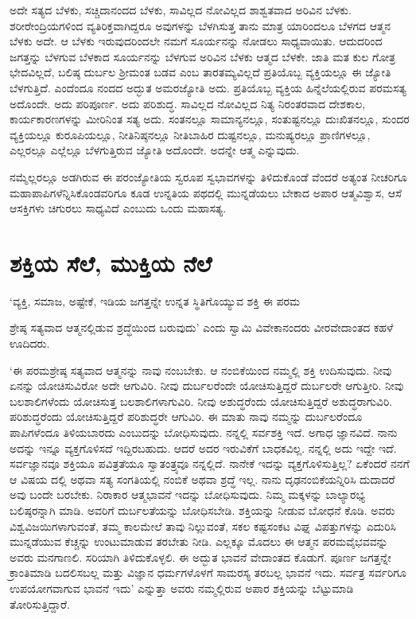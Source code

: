 ಅದೇ ಸತ್ಯದ ಬೆಳಕು, ಸಚ್ಚಿದಾನಂದದ ಬೆಳಕು, ಸಾವಿಲ್ಲದ ನೋವಿಲ್ಲದ ಶಾಶ್ವತವಾದ ಅರಿವಿನ ಬೆಳಕು. ಶರೀರೇಂದ್ರಿಯಗಳಿಂದ ವ್ಯತಿರಿಕ್ತವಾಗಿದ್ದರೂ ಅವುಗಳನ್ನು ಬೆಳಗಿಸುತ್ತ ತಾನು ಮಾತ್ರ ಯಾರಿಂದಲೂ ಬೆಳಗದ ಆತ್ಮನ ಬೆಳಕು ಅದೇ. ಆ ಬೆಳಕು ಇರುವುದರಿಂದಲೇ ನಮಗೆ ಸೂರ್ಯನನ್ನು ನೋಡಲು ಸಾಧ್ಯವಾಯಿತು. ಆದುದರಿಂದ ಜಗತ್ತನ್ನು ಬೆಳಗುವ ಬೆಳಕಾದ ಸೂರ್ಯನನ್ನು ಬೆಳಗುವ ಅರಿವಿನ ಬೆಳಕು ಆತ್ಮದ ಬೆಳಕೇ. ಜಾತಿ ಮತ ಕುಲ ಗೋತ್ರ ಭೇದವಿಲ್ಲದೆ, ಬಲಿಷ್ಠ ದುರ್ಬಲ ಶ‍್ರೀಮಂತ ಬಡವ ಎಂಬ ತಾರತಮ್ಯವಿಲ್ಲದೆ ಪ್ರತಿಯೊಬ್ಬ ವ್ಯಕ್ತಿಯಲ್ಲೂ ಈ ಜ್ಯೋತಿ ಬೆಳಗುತ್ತಿದೆ. ಎಂದೆಂದೂ ನಂದದ ಅದ್ಭುತ ಅಮರಜ್ಯೋತಿ ಅದು. ಪ್ರತಿಯೊಬ್ಬ ವ್ಯಕ್ತಿಯ ಹಿನ್ನೆಲೆಯಲ್ಲಿರುವ ಪರಮಸತ್ಯ ಅದೊಂದೇ. ಅದು ಪರಿಪೂರ್ಣ. ಅದು ಪರಿಶುದ್ಧ. ಸಾವಿಲ್ಲದ ನೋವಿಲ್ಲದ ನಿತ್ಯ ನಿರಂತರವಾದ ದೇಶಕಾಲ, ಕಾರ್ಯಕಾರಣಗಳನ್ನು ಮೀರಿನಿಂತ ಸತ್ಯ ಅದು. ಸಂತನಲ್ಲೂ ಸಾಮಾನ್ಯನಲ್ಲೂ, ಸಂತುಷ್ಟನಲ್ಲೂ ದುಃಖಿತನಲ್ಲೂ, ಸುಂದರ ವ್ಯಕ್ತಿ\-ಯಲ್ಲೂ ಕುರೂಪಿಯಲ್ಲೂ, ನೀತಿನಿಷ್ಠನಲ್ಲೂ ನೀತಿಬಾಹಿರ ದುಷ್ಟನಲ್ಲೂ, ಮನುಷ್ಯರಲ್ಲೂ ಪ್ರಾಣಿಗಳಲ್ಲೂ, ಎಲ್ಲರಲ್ಲೂ ಎಲ್ಲೆಲ್ಲೂ ಬೆಳಗುತ್ತಿರುವ ಜ್ಯೋತಿ ಅದೊಂದೇ. ಅದನ್ನೇ ಆತ್ಮ ಎನ್ನುವುದು.

ನಮ್ಮೆಲ್ಲರಲ್ಲೂ ಅಡಗಿರುವ ಈ ಪರಂಜ್ಯೋತಿಯ ಸ್ವರೂಪ ಸ್ವಭಾವಗಳನ್ನು ತಿಳಿದುಕೊಂಡೆ ವೆಂದರೆ ಅತ್ಯಂತ ನೀಚರಿಗೂ ಮಹಾಪಾಪಿಗಳೆನ್ನಿಸಿಕೊಂಡವರಿಗೂ ಕೂಡ ಉನ್ನತಿಯ ಪಥದಲ್ಲಿ ಮುನ್ನಡೆಯಲು ಬೇಕಾದ ಅಪಾರ ಆತ್ಮವಿಶ್ವಾಸ, ಆಸೆ ಆಸಕ್ತಿಗಳು ಚಿಗುರಲು ಸಾಧ್ಯವಿದೆ ಎಂಬುದು ಒಂದು ಮಹಾಸತ್ಯ.


\section*{ಶಕ್ತಿಯ ಸೆಲೆ, ಮುಕ್ತಿಯ ನೆಲೆ}


{\parfillskip=0pt ‘ವ್ಯಕ್ತಿ, ಸಮಾಜ, ಅಷ್ಟೇಕೆ, ಇಡಿಯ ಜಗತ್ತನ್ನೇ ಉನ್ನತ ಸ್ಥಿತಿಗೊಯ್ಯುವ ಶಕ್ತಿ ಈ ಪರಮ\par}\newpage\noindent ಶ್ರೇಷ್ಠ ಸತ್ಯವಾದ ಆತ್ಮನಲ್ಲಿಡುವ ಶ್ರದ್ಧೆಯಿಂದ ಬರುವುದು’ ಎಂದು ಸ್ವಾಮಿ ವಿವೇಕಾನಂದರು ವೀರವೇದಾಂತದ ಕಹಳೆ ಊದಿದರು.

‘ಈ ಪರಮಶ್ರೇಷ್ಠ ಸತ್ಯವಾದ ಆತ್ಮನನ್ನು ನಾವು ನಂಬಬೇಕು. ಆ ನಂಬಿಕೆಯಿಂದ ನಮ್ಮಲ್ಲಿ ಶಕ್ತಿ ಉದಿಸುವುದು. ನೀವು ಏನನ್ನು ಯೋಚಿಸುವಿರೋ ಅದೇ ಆಗುವಿರಿ. ನೀವು ದುರ್ಬಲರೆಂದೇ ಯೋಚಿಸುತ್ತಿದ್ದರೆ ದುರ್ಬಲರೇ ಆಗುತ್ತೀರಿ. ನೀವು ಬಲಶಾಲಿಗಳೆಂದು ಯೋಚಿಸುತ್ತ ಬಲಶಾಲಿ\-ಗಳಾ\-ಗುವಿರಿ. ನೀವು ಅಶುದ್ಧರೆಂದು ಯೋಚಿಸುತ್ತಿದ್ದರೆ ಅಶುದ್ಧರಾಗುವಿರಿ. ಪರಿಶುದ್ಧರೆಂದು ಯೋಚಿಸುತ್ತಿದ್ದರೆ ಪರಿಶುದ್ಧರೇ ಆಗುವಿರಿ. ಈ ಮಾತು ನಾವು ನಮ್ಮನ್ನು ದುರ್ಬಲರೆಂದೂ ಪಾಪಿಗಳೆಂದೂ ತಿಳಿಯಬಾರದು ಎಂಬುದನ್ನು ಬೋಧಿಸುವುದು. ನನ್ನಲ್ಲಿ ಸರ್ವಶಕ್ತಿ ಇದೆ. ಅಗಾಧ ಜ್ಞಾನವಿದೆ. ನಾನು ಅದನ್ನು ಇನ್ನೂ ವ್ಯಕ್ತಗೊಳಿಸದೆ ಇದ್ದಿರಬಹುದು. ಆದರೆ ಅದರ ಇರುವಿಕೆಗೆ ಬಾಧಕವಿಲ್ಲ. ನನ್ನಲ್ಲಿ ಅದು ಇದ್ದೇ ಇದೆ. ಸರ್ವಜ್ಞಾನವೂ ಶಕ್ತಿಯೂ ಪವಿತ್ರತೆಯೂ ಸ್ವಾತಂತ್ರ್ಯವೂ ನನ್ನಲ್ಲಿದೆ. ನಾನೇಕೆ ಇದನ್ನು ವ್ಯಕ್ತಗೊಳಿಸುತ್ತಿಲ್ಲ? ಏಕೆಂದರೆ ನನಗೆ ಆ ವಿಷಯ ದಲ್ಲಿ ಅಥವಾ ಸತ್ಯ ಸಂಗತಿಯಲ್ಲಿ ನಂಬಿಕೆ ಅಥವಾ ಶ್ರದ್ಧೆ ಇಲ್ಲ. ನಾನು ದೃಢನಂಬಿಕೆಯನ್ನಿರಿಸಿ ದುದಾದರೆ ಅವು ಬಂದೇ ಬರಬೇಕು. ನಿರಾಕಾರ ಆತ್ಮಭಾವನೆ ಇದನ್ನು ಬೋಧಿಸುವುದು. ನಿಮ್ಮ ಮಕ್ಕಳನ್ನು ಬಾಲ್ಯಾರಭ್ಯ ಬಲಿಷ್ಠರನ್ನಾಗಿ ಮಾಡಿ. ಅವರಿಗೆ ದುರ್ಬಲತೆಯನ್ನು ಬೋಧಿಸಬೇಡಿ. ಶಕ್ತಿಯನ್ನು ನೀಡುವ ಬೋಧನೆ ಕೊಡಿ. ಅವರು ವಿಶ್ವವಿಜಯಿಗಳಾಗುವಂತೆ, ತಮ್ಮ ಕಾಲಮೇಲೆ ತಾವು ನಿಲ್ಲುವಂತೆ, ಸಕಲ ಕಷ್ಟಸಂಕಟ ವಿಘ್ನ ವಿಪತ್ತುಗಳನ್ನು ಎದುರಿಸಿ ಮುನ್ನಡೆಯುವ ಕೆಚ್ಚನ್ನು ಉಂಟುಮಾಡುವ ತರಬೇತು ನೀಡಿ. ಎಲ್ಲಕ್ಕೂ ಮೊದಲು ಈ ಆತ್ಮನ ಪರಮವೈಭವವನ್ನು ಅವರು ಮನಗಾಣಲಿ. ಸರಿಯಾಗಿ ತಿಳಿದುಕೊಳ್ಳಲಿ. ಈ ಅದ್ಭುತ ಭಾವನೆ ವೇದಾಂತದ ಕೊಡುಗೆ. ಪೂರ್ಣ ಜಗತ್ತನ್ನೇ ಕ್ರಾಂತಿಮಾಡಿ ಬದಲಿಸಬಲ್ಲ ಮತ್ತು ವಿಜ್ಞಾನ ಧರ್ಮಗಳೊಳಗೆ ಸಾಮರಸ್ಯ ತರಬಲ್ಲ ಭಾವನೆ ಇದು. ಸರ್ವತ್ರ ಸರ್ವರಿಗೂ ಉಪಯೋಗವಾಗುವ ಭಾವನೆ ಇದು’ ಎನ್ನುತ್ತಾ ಅವರು ನಮ್ಮಲ್ಲಿರುವ ಅಪಾರ ಶಕ್ತಿಯನ್ನು ಬೆಟ್ಟುಮಾಡಿ ತೋರಿಸುತ್ತಿದ್ದಾರೆ.


